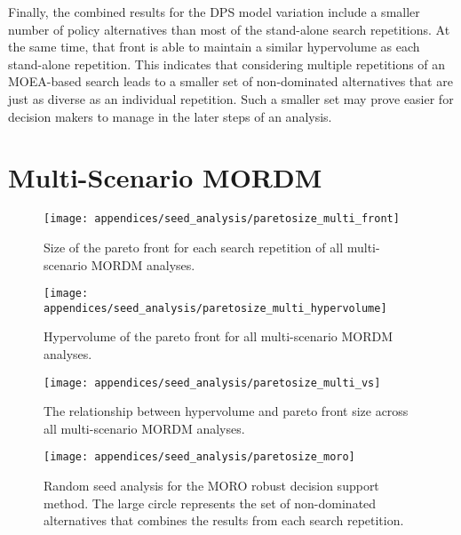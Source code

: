 Finally, the combined results for the DPS model variation include a smaller number of policy alternatives than most of the stand-alone search repetitions. At the same time, that front is able to maintain a similar hypervolume as each stand-alone repetition. This indicates that considering multiple repetitions of an MOEA-based search leads to a smaller set of non-dominated alternatives that are just as diverse as an individual repetition. Such a smaller set may prove easier for decision makers to manage in the later steps of an analysis. 

\section{Multi-Scenario MORDM}

\begin{figure}[H]
    \centering
    
    \texttt{[image: appendices/seed\_analysis/paretosize\_multi\_front]}
    \caption[Pareto front size across search repetitions for multi-scenario MORDM]{Size of the pareto front for each search repetition of all multi-scenario MORDM analyses.}
    \label{fig:pareto-multi-size}
\end{figure}

\begin{figure}[H]
    \centering
    
    \texttt{[image: appendices/seed\_analysis/paretosize\_multi\_hypervolume]}
    \caption{Hypervolume of the pareto front for all multi-scenario MORDM analyses.}
    \label{fig:pareto-multi-volume}
\end{figure}

\begin{figure}[H]
    \centering
    
    \texttt{[image: appendices/seed\_analysis/paretosize\_multi\_vs]}
    \caption{The relationship between hypervolume and pareto front size across all multi-scenario MORDM analyses.}
    \label{fig:pareto-multi-versus}
\end{figure}

\begin{figure}[H]
    \centering
    
    \texttt{[image: appendices/seed\_analysis/paretosize\_moro]}
    \caption[Random seed analysis for all uses of MORO]{Random seed analysis for the MORO robust decision support method. The large circle represents the set of non-dominated alternatives that combines the results from each search repetition.}
    \label{fig:pareto-moro}
\end{figure}

